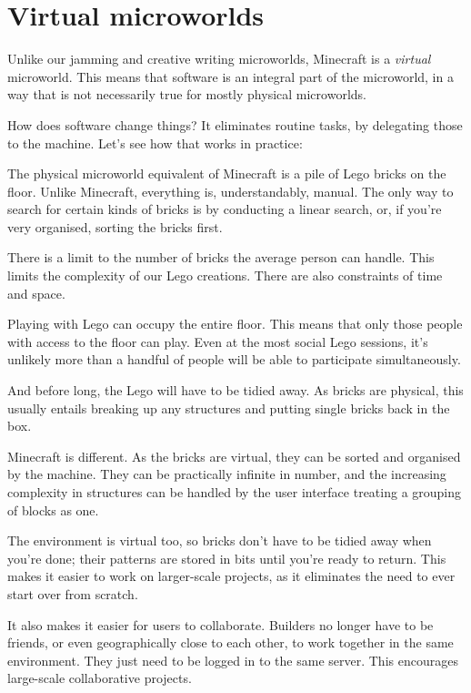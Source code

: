 \section{Virtual microworlds}

Unlike our jamming and creative writing microworlds, Minecraft is a
\emph{virtual} microworld. This means that software is an integral part
of the microworld, in a way that is not necessarily true for mostly
physical microworlds.

How does software change things? It eliminates routine tasks, by
delegating those to the machine. Let's see how that works in practice:

The physical microworld equivalent of Minecraft is a pile of Lego bricks
on the floor. Unlike Minecraft, everything is, understandably, manual.
The only way to search for certain kinds of bricks is by conducting a
linear search, or, if you're very organised, sorting the bricks first.

There is a limit to the number of bricks the average person can handle.
This limits the complexity of our Lego creations. There are also
constraints of time and space.

Playing with Lego can occupy the entire floor. This means that only
those people with access to the floor can play. Even at the most social
Lego sessions, it's unlikely more than a handful of people will be able
to participate simultaneously.

And before long, the Lego will have to be tidied away. As bricks are
physical, this usually entails breaking up any structures and putting
single bricks back in the box.

Minecraft is different. As the bricks are virtual, they can be sorted
and organised by the machine. They can be practically infinite in
number, and the increasing complexity in structures can be handled by
the user interface treating a grouping of blocks as one.

The environment is virtual too, so bricks don't have to be tidied away
when you're done; their patterns are stored in bits until you're ready
to return. This makes it easier to work on larger-scale projects, as it
eliminates the need to ever start over from scratch.

It also makes it easier for users to collaborate. Builders no longer
have to be friends, or even geographically close to each other, to work
together in the same environment. They just need to be logged in to the
same server. This encourages large-scale collaborative projects.

